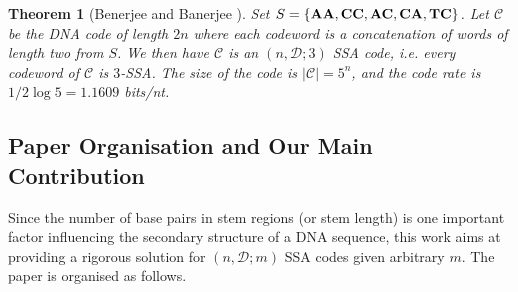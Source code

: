 \documentclass[conference]{IEEEtran}
\theoremstyle{plain}
\newtheorem{theorem}{Theorem}
\theoremstyle{definition}
\newcommand{\C}{{\mathcal C}}
\newcommand{\D}{{\mathcal D}}
\begin{document}
\begin{theorem}[Benerjee and Banerjee \cite{K:2021}]
Set $S=\{{\bf A}{\bf A}, {\bf C}{\bf C}, {\bf A}{\bf C}, {\bf C}{\bf A},{\bf T}{\bf C}\}$. Let $\C$ be the DNA code of length $2n$ where each codeword is a concatenation of words of length two from $S$. We then have $\C$ is an $(n,\D;3)$ SSA code, i.e. every codeword of $\C$ is $3$-SSA. The size of the code is $|\C|=5^n$, and the code rate is $1/2 \log 5 = 1.1609$ bits/nt.  
\end{theorem}

\subsection{Paper Organisation and Our Main Contribution}

Since the number of base pairs in stem regions (or stem length) is one important factor influencing the secondary structure of a DNA sequence, this work aims at providing a rigorous solution for $(n,\D;m)$ SSA codes given arbitrary $m$. 
The paper is organised as follows. 
\end{document}
